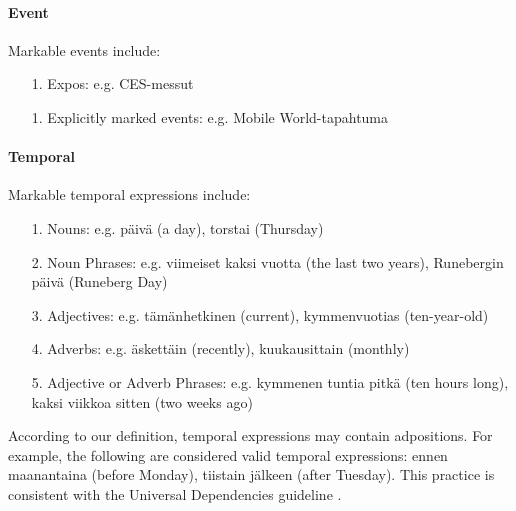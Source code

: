 \documentclass[11pt]{article}
\begin{document}
\paragraph{Event}

Markable events include:

\begin{itemize}

\item[1.] Expos: e.g. CES-messut
\item[1.] Explicitly marked events: e.g. Mobile World-tapahtuma

\end{itemize}



\paragraph{Temporal} Markable temporal expressions include:

\begin{itemize}

\item[1.] Nouns: e.g. p\"aiv\"a (a day), torstai (Thursday)
\item[2.] Noun Phrases: e.g. viimeiset kaksi vuotta (the last two years),  Runebergin p\"aiv\"a (Runeberg Day)
\item[3.] Adjectives: e.g. t\"am\"anhetkinen (current), kymmenvuotias (ten-year-old) 
\item[4.] Adverbs: e.g. \"askett\"ain (recently), kuukausittain (monthly)
\item[5.] Adjective or Adverb Phrases: e.g.  kymmenen tuntia pitk\"a (ten hours long), kaksi viikkoa sitten (two weeks ago)

\end{itemize}

According to our definition, temporal expressions may contain adpositions. For example, the following are considered valid temporal expressions: ennen maanantaina (before Monday), tiistain j\"alkeen (after Tuesday). This practice is consistent with the Universal Dependencies guideline \cite{}.


\end{document}

